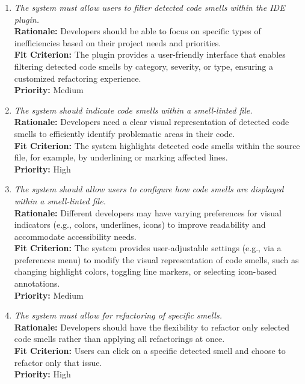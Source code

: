\documentclass[12pt]{article}
\begin{document}
\begin{enumerate}[label=FR \arabic*., wide=0pt, leftmargin=*]
    balance between energy efficiency and their coding style or
    project requirements.\\
    {\bf Fit Criterion:} The IDE plugin must display refactoring
    options for inefficient
    code patterns if possible, allowing developers to either apply or
    reject them before making any changes. \\
    {\bf Priority:} Medium
  \item \emph{The system must allow users to filter detected code
    smells within the IDE plugin.}\\[2mm]
    {\bf Rationale:} Developers should be able to focus on specific
    types of inefficiencies based on their
    project needs and priorities.\\
    {\bf Fit Criterion:} The plugin provides a user-friendly
    interface that enables filtering detected code
    smells by category, severity, or type, ensuring a customized
    refactoring experience.\\
    {\bf Priority:} Medium
  \item \emph{The system should indicate code smells within a
    smell-linted file.}\\[2mm]
    {\bf Rationale:} Developers need a clear visual representation of
    detected code smells to efficiently identify problematic areas in
    their code.\\
    {\bf Fit Criterion:} The system highlights detected code smells
    within the source file, for example, by underlining or marking
    affected lines.\\
    {\bf Priority:} High

  \item \emph{The system should allow users to configure how code
    smells are displayed within a smell-linted file.}\\[2mm]
    {\bf Rationale:} Different developers may have varying
    preferences for visual indicators (e.g., colors, underlines,
    icons) to improve readability and accommodate accessibility needs.\\
    {\bf Fit Criterion:} The system provides user-adjustable settings
    (e.g., via a preferences menu) to modify the visual
    representation of code smells, such as changing highlight colors,
    toggling line markers, or selecting icon-based annotations.\\
    {\bf Priority:} Medium

  \item \emph{The system must allow for refactoring of specific smells.}\\[2mm]
    {\bf Rationale:} Developers should have the flexibility to
    refactor only selected code smells rather than applying all
    refactorings at once.\\
    {\bf Fit Criterion:} Users can click on a specific detected smell
    and choose to refactor only that issue.\\
    {\bf Priority:} High


\end{enumerate}
\end{document}

